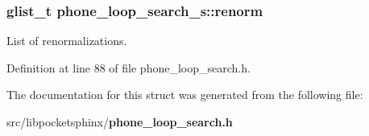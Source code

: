 \subsubsection[{renorm}]{\setlength{\rightskip}{0pt plus 5cm}glist\+\_\+t phone\+\_\+loop\+\_\+search\+\_\+s\+::renorm}\label{structphone__loop__search__s_a273295fbe1a22ad3ddf7db8695a394ec}


List of renormalizations. 



Definition at line 88 of file phone\+\_\+loop\+\_\+search.\+h.



The documentation for this struct was generated from the following file\+:\begin{DoxyCompactItemize}
\item 
src/libpocketsphinx/{\bf phone\+\_\+loop\+\_\+search.\+h}\end{DoxyCompactItemize}
